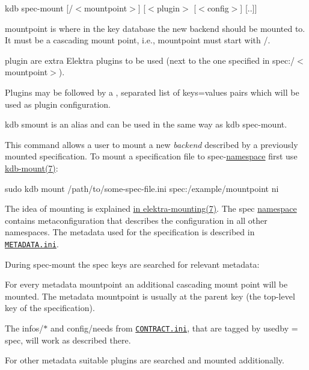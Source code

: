 {\ttfamily kdb spec-\/mount \mbox{[}/$<$mountpoint$>$\mbox{]} \mbox{[}$<$plugin$>$ \mbox{[}$<$config$>$\mbox{]} \mbox{[}..\mbox{]}\mbox{]}}


\begin{DoxyItemize}
\item {\ttfamily mountpoint} is where in the key database the new backend should be mounted to. It must be a cascading mount point, i.\+e., {\ttfamily mountpoint} must start with {\ttfamily /}.
\item {\ttfamily plugin} are extra Elektra plugins to be used (next to the one specified in {\ttfamily spec\+:/$<$mountpoint$>$}).
\item Plugins may be followed by a {\ttfamily ,} separated list of {\ttfamily keys=values} pairs which will be used as plugin configuration.
\end{DoxyItemize}

{\ttfamily kdb smount} is an alias and can be used in the same way as {\ttfamily kdb spec-\/mount}.

This command allows a user to mount a new {\itshape backend} described by a previously mounted specification. To mount a specification file to {\ttfamily spec}-\/\hyperlink{doc_help_elektra-namespaces_md}{namespace} first use \hyperlink{doc_help_kdb-mount_md}{kdb-\/mount(7)}\+:


\begin{DoxyCode}
sudo kdb mount /path/to/some-spec-file.ini spec:/example/mountpoint ni
\end{DoxyCode}


The idea of mounting is explained \hyperlink{doc_help_elektra-mounting_md}{in elektra-\/mounting(7)}. The {\ttfamily spec} \hyperlink{doc_help_elektra-namespaces_md}{namespace} contains metaconfiguration that describes the configuration in all other namespaces. The metadata used for the specification is described in \href{/home/jenkins/workspace/libelektra-release/doc/METADATA.ini}{\tt M\+E\+T\+A\+D\+A\+T\+A.\+ini}.

During {\ttfamily spec-\/mount} the {\ttfamily spec} keys are searched for relevant metadata\+:


\begin{DoxyItemize}
\item For every metadata {\ttfamily mountpoint} an additional cascading mount point will be mounted. The metadata {\ttfamily mountpoint} is usually at the parent key (the top-\/level key of the specification).
\item The {\ttfamily infos/$\ast$} and {\ttfamily config/needs} from \href{/home/jenkins/workspace/libelektra-release/doc/CONTRACT.ini}{\tt C\+O\+N\+T\+R\+A\+C\+T.\+ini}, that are tagged by {\ttfamily usedby = spec}, will work as described there.
\item For other metadata suitable plugins are searched and mounted additionally.
\end{DoxyItemize}

